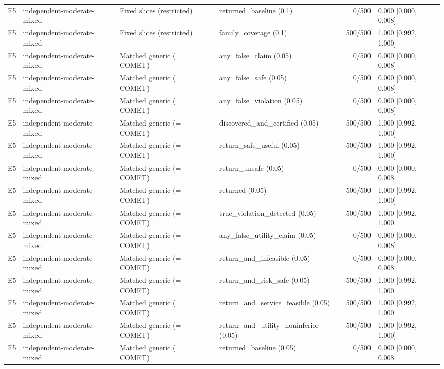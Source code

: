 \begin{longtable}{p{.04\linewidth}p{.18\linewidth}p{.19\linewidth}p{.16\linewidth}r p{.21\linewidth}}
E5 & independent-moderate-mixed & Fixed slices (restricted) & returned\_baseline (0.1) & 0/500 & 0.000 [0.000, 0.008]\\
E5 & independent-moderate-mixed & Fixed slices (restricted) & family\_coverage (0.1) & 500/500 & 1.000 [0.992, 1.000]\\
E5 & independent-moderate-mixed & Matched generic (= COMET) & any\_false\_claim (0.05) & 0/500 & 0.000 [0.000, 0.008]\\
E5 & independent-moderate-mixed & Matched generic (= COMET) & any\_false\_safe (0.05) & 0/500 & 0.000 [0.000, 0.008]\\
E5 & independent-moderate-mixed & Matched generic (= COMET) & any\_false\_violation (0.05) & 0/500 & 0.000 [0.000, 0.008]\\
E5 & independent-moderate-mixed & Matched generic (= COMET) & discovered\_and\_certified (0.05) & 500/500 & 1.000 [0.992, 1.000]\\
E5 & independent-moderate-mixed & Matched generic (= COMET) & return\_safe\_useful (0.05) & 500/500 & 1.000 [0.992, 1.000]\\
E5 & independent-moderate-mixed & Matched generic (= COMET) & return\_unsafe (0.05) & 0/500 & 0.000 [0.000, 0.008]\\
E5 & independent-moderate-mixed & Matched generic (= COMET) & returned (0.05) & 500/500 & 1.000 [0.992, 1.000]\\
E5 & independent-moderate-mixed & Matched generic (= COMET) & true\_violation\_detected (0.05) & 500/500 & 1.000 [0.992, 1.000]\\
E5 & independent-moderate-mixed & Matched generic (= COMET) & any\_false\_utility\_claim (0.05) & 0/500 & 0.000 [0.000, 0.008]\\
E5 & independent-moderate-mixed & Matched generic (= COMET) & return\_and\_infeasible (0.05) & 0/500 & 0.000 [0.000, 0.008]\\
E5 & independent-moderate-mixed & Matched generic (= COMET) & return\_and\_risk\_safe (0.05) & 500/500 & 1.000 [0.992, 1.000]\\
E5 & independent-moderate-mixed & Matched generic (= COMET) & return\_and\_service\_feasible (0.05) & 500/500 & 1.000 [0.992, 1.000]\\
E5 & independent-moderate-mixed & Matched generic (= COMET) & return\_and\_utility\_noninferior (0.05) & 500/500 & 1.000 [0.992, 1.000]\\
E5 & independent-moderate-mixed & Matched generic (= COMET) & returned\_baseline (0.05) & 0/500 & 0.000 [0.000, 0.008]\\

\end{longtable}

